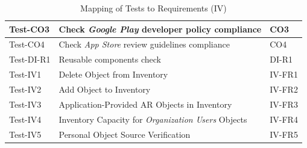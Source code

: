 \documentclass[12pt, titlepage]{article}
\begin{document}
\begin{table}[htpb!]
\begin{tabular}{|l|p{8cm}|p{3cm}|}
    \hline
    Test-CO3         & Check \textit{Google Play} developer policy compliance                      & CO3                   \\
    \hline
    Test-CO4         & Check \textit{App Store} review guidelines compliance                       & CO4                   \\
    \hline
    Test-DI-R1       & Reusable components check                                                   & DI-R1                 \\
    \hline
    Test-IV1         & Delete Object from Inventory                                                & IV-FR1                \\
    \hline
    Test-IV2         & Add Object to Inventory                                                     & IV-FR2                \\
    \hline
    Test-IV3         & Application-Provided AR Objects in Inventory                                & IV-FR3                \\
    \hline
    Test-IV4         & Inventory Capacity for \textit{Organization Users} Objects                  & IV-FR4                \\
    \hline
    Test-IV5         & Personal Object Source Verification                                         & IV-FR5                \\
    \hline
  \end{tabular}
  \caption{Mapping of Tests to Requirements (IV)}
  \label{tab:test_requirements4}
\end{table}
\end{document}
